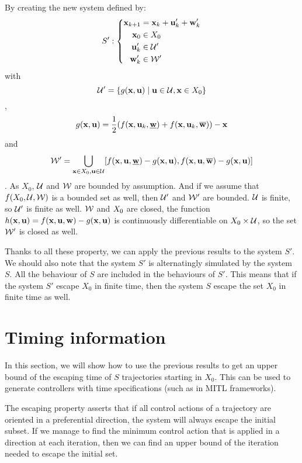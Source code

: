 By creating the new system defined by:
\begin{equation}
S':\left\{
\begin{split}
 \mathbf{x}_{k+1} &=  \mathbf{x}_k +  \mathbf{u}_k' +  \mathbf{w}_k'\\
 \mathbf{x}_0 &\in X_0\\
 \mathbf{u}_k' &\in \mathcal{U}'\\
 \mathbf{w}_k' &\in \mathcal{W}'\\
\end{split}
\right.
\end{equation}
with
$$\mathcal{U}' = \{ g( \mathbf{x}, \mathbf{u}) \mid  \mathbf{u} \in \mathcal{U},  \mathbf{x} \in X_0\}$$,
$$g( \mathbf{x}, \mathbf{u}) = \frac{1}{2}(f( \mathbf{x}, \mathbf{u}_k,\underline{ \mathbf{w}})+f( \mathbf{x}, \mathbf{u}_k,\overline{ \mathbf{w}})) - \mathbf{x}$$
and 
$$\mathcal{W}' = \bigcup_{ \mathbf{x} \in X_0, \mathbf{u} \in \mathcal{U}} [f( \mathbf{x}, \mathbf{u},\underline{ \mathbf{w}})-g( \mathbf{x}, \mathbf{u}),f( \mathbf{x}, \mathbf{u},\overline{ \mathbf{w}})-g( \mathbf{x}, \mathbf{u})]$$.
As $X_0$, $\mathcal{U}$ and $\mathcal{W}$ are bounded by assumption. And if we assume that $f(X_0,\mathcal{U},\mathcal{W})$ is a bounded set as well, then $\mathcal{U}'$ and $\mathcal{W}'$ are bounded. $\mathcal{U}$ is finite, so $\mathcal{U}'$ is finite as well. $\mathcal{W}$ and $X_0$ are closed, the function $h( \mathbf{x}, \mathbf{u}) = f( \mathbf{x}, \mathbf{u}, \mathbf{w}) - g( \mathbf{x}, \mathbf{u})$ is continuously differentiable on $X_0\times\mathcal{U}$, so the set $\mathcal{W}'$ is closed as well.

Thanks to all these property, we can apply the previous results to the system $S'$. 
We should also note that the system $S'$ is alternatingly simulated by the system $S$. All the behaviour of $S$ are included in the behaviours of $S'$. This means that if the system $S'$ escape $X_0$ in finite time, then the system $S$ escape the set $X_0$ in finite time as well.

\section{Timing  information}\label{sec_timing}
In this section, we will show how to use the previous results to get an upper bound of the escaping time of $S$ trajectories starting in $X_0$.
This can be used to generate controllers with time specifications (such as in MITL frameworks).

The escaping property asserts that if all control actions of a trajectory are oriented in a preferential direction, the system will always escape the initial subset.
If we manage to find the minimum control action that is applied in a direction at each iteration, then we can find an upper bound of the iteration needed to escape the initial set.

